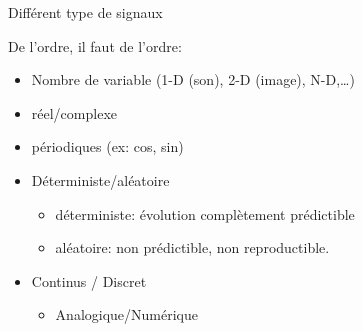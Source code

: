 \documentclass{beamer}
\begin{document}
\begin{frame}{Différent type de signaux}

  De l'ordre, il faut de l'ordre:

  \begin{itemize}[<+(1)->]
    \item Nombre de variable (1-D (son), 2-D (image), N-D,\ldots)
    \item réel/complexe
    \item périodiques (ex: cos, sin)
    \item Déterministe/aléatoire
    \begin{itemize}[<.->]
      \item déterministe: évolution complètement prédictible
      \item aléatoire: non prédictible, non reproductible.
    \end{itemize}
    \item Continus / Discret
    \begin{itemize}[<.->]
      \item Analogique/Numérique
    \end{itemize}
  \end{itemize}
\end{frame}
\end{document}
